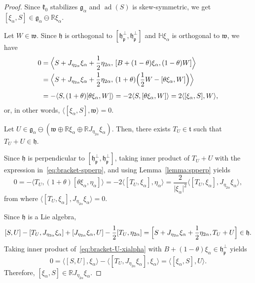 \documentclass[12pt, a4paper]{amsart}
\newcommand{\g}{\mathfrak}
\newcommand{\R}{\mathbb{R}}
\renewcommand{\H}{\mathbb{H}}
\newcommand{\ad}{\operatorname{ad}}
\theoremstyle{definition}
\begin{document}
\begin{proof}
Since $\g{k}_0$ stabilizes $\g{g}_\alpha$ and $\ad(S)$ is skew-symmetric, we get $[\xi_\alpha,S]\in\g{g}_\alpha\ominus\R\xi_\alpha$.
	
Let $W\in\g{w}$.
Since $\g{h}$ is orthogonal to $[\g{h}_{\g{p}}^\perp,\g{h}_{\g{p}}^\perp]$ 
and $\H\xi_\alpha$ is orthogonal to $\g{w}$, 
we have
\begin{align*}
0&{}=\Bigl< S+J_{\eta_{2\alpha}}\xi_\alpha+\frac{1}{2}\eta_{2\alpha},\,
[B+(1-\theta)\xi_\alpha,(1-\theta)W]\Bigr>\\
&{}=\Bigl< S+J_{\eta_{2\alpha}}\xi_\alpha+\frac{1}{2}\eta_{2\alpha},\,
(1+\theta)\Bigl(\frac{1}{2}W-[\theta\xi_\alpha,W]\Bigr)\Bigr>\\[1ex]
&{}=-\langle S,(1+\theta)[\theta\xi_\alpha,W]\rangle
=-2\langle S,[\theta\xi_\alpha,W]\rangle=2\langle [\xi_\alpha,S],W\rangle,
\end{align*}
or, in other words, $\langle[\xi_\alpha,S],\g{w}\rangle=0$.

Let $U\in\g{g}_\alpha\ominus(\g{w}\oplus\R\xi_\alpha\oplus\R J_{\eta_{2\alpha}}\xi_\alpha)$.
Then, there exists $T_U\in\g{t}$ such that $T_U+U\in\g{h}$.

Since $\g{h}$ is perpendicular to $[\g{h}_{\g{p}}^\perp,\g{h}_{\g{p}}^\perp]$, taking inner product of $T_U+U$ with the expression in~\eqref{eq:bracket-spperp}, and using Lemma~\ref{lemma:spperp} yields
\[
0=-\langle T_U,(1+\theta)[\theta\xi_\alpha,\eta_\alpha]\rangle
=-2\langle[T_U,\xi_\alpha],\eta_\alpha\rangle
=\frac{2}{\lvert\xi_\alpha\rvert^2}\langle[T_U,\xi_\alpha],J_{\eta_{2\alpha}}\xi_\alpha\rangle,
\]
from where $\langle[T_U,\xi_\alpha],J_{\eta_{2\alpha}}\xi_\alpha\rangle=0$.

Since $\g{h}$ is a Lie algebra,
\begin{equation}\label{eq:bracket-U-xialpha}
[S,U]-[T_U,J_{\eta_{2\alpha}}\xi_\alpha]+[J_{\eta_{2\alpha}}\xi_\alpha,U]-\frac{1}{2}[T_U,\eta_{2\alpha}]
=\Bigl[S+J_{\eta_{2\alpha}}\xi_\alpha+\frac{1}{2}\eta_{2\alpha},T_U+U\Bigr]\in\g{h}.
\end{equation}
Taking inner product of~\eqref{eq:bracket-U-xialpha} with $B+(1-\theta)\xi_\alpha\in\g{h}_{\g{p}}^\perp$ yields
\[
0=\langle[S,U],\xi_\alpha\rangle-\langle[T_U,J_{\eta_{2\alpha}}\xi_\alpha],\xi_\alpha\rangle
=\langle[\xi_\alpha,S],U\rangle.
\]
Therefore, $[\xi_\alpha,S]\in\R J_{\eta_{2\alpha}}\xi_\alpha$.


\end{proof}
\end{document}
